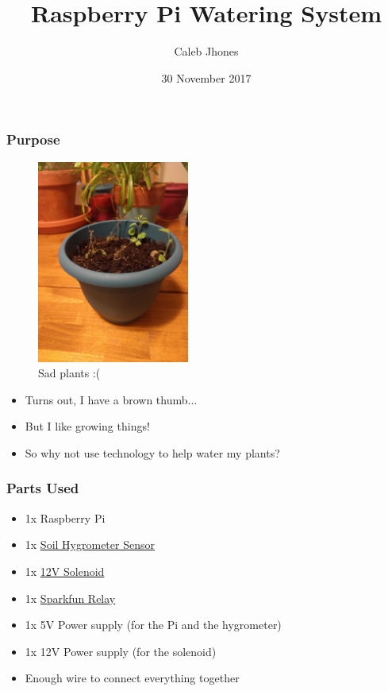 \documentclass{beamer}
\title{Raspberry Pi Watering System}
\author{Caleb Jhones}
\date{30 November 2017}
\institute{CSCI 250}
\begin{document}
\begin{frame}
    \maketitle
\end{frame}

\begin{frame}
    \frametitle{Purpose}
    \begin{minipage}{0.45\textwidth}
        \begin{figure}
            \includegraphics[width=5cm]{img/sad-plants}
            \caption{Sad plants :(}
        \end{figure}
    \end{minipage}%
    \begin{minipage}{0.55\textwidth}
        \begin{itemize}
            \item Turns out, I have a brown thumb...
            \pause
            \item But I like growing things!
            \pause
            \item So why not use technology to help water my plants?
        \end{itemize}
    \end{minipage}%
\end{frame}

\begin{frame}
    \frametitle{Parts Used}
    \begin{itemize}
        \item 1x Raspberry Pi
        \item 1x \href{https://www.amazon.com/gp/product/B01FDGUHBM}{Soil Hygrometer Sensor}
        \item 1x \href{https://www.sparkfun.com/products/10456}{12V Solenoid}
        \item 1x \href{https://www.sparkfun.com/products/13815}{Sparkfun Relay}
        \item 1x 5V Power supply (for the Pi and the hygrometer)
        \item 1x 12V Power supply (for the solenoid)
        \item Enough wire to connect everything together
    \end{itemize}
\end{frame}
\end{document}
